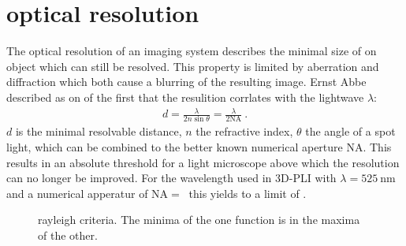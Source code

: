 \section{optical resolution}
\label{sec:opticalResolution}
% 
The optical resolution of an imaging system describes the minimal size of on object which can still be resolved.
This property is limited by aberration and diffraction which both cause a blurring of the resulting image.
Ernst Abbe described as on of the first that the resulition corrlates with the lightwave $\lambda$: 
\begin{align}
d=\frac{ \lambda}{2 n \sin \theta} = \frac{\lambda}{2\mathrm{NA}} \> .
\end{align}
$d$ is the minimal resolvable distance, $n$ the refractive index, $\theta$ the angle of a spot light, which can be combined to the better known numerical aperture $\mathrm{NA}$.
This results in an absolute threshold for a light microscope above which the resolution can no longer be improved.
For the wavelength used in \ac{3D-PLI} with $\lambda = \SI{525}{\nano\meter}$ and a numerical apperatur of $\mathrm{NA} = \SI{}{}$ this yields to a limit of \dummy{}.
% 
\begin{figure}[!t]
\setlength{\tikzwidth}{0.45\textwidth}
\centering
\caption[Raylay criterium]{rayleigh criteria. The minima of the one function is in the maxima of the other.}
\label{fig:rayleigh}
\end{figure}
% 
